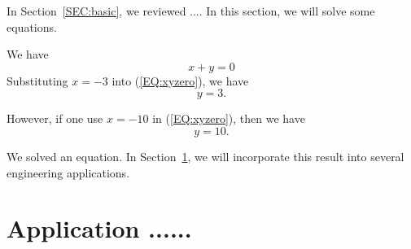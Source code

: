 \documentclass[11pt,a4paper]{article}
\begin{document}
In Section~\ref{SEC:basic}, we reviewed .... In this section, we will solve some equations.

We have 
\begin{equation}
x + y = 0
\label{EQ:xyzero}
\end{equation}
Substituting $x=-3$ into (\ref{EQ:xyzero}), we have 
\[
y=3.
\]

However, if one use $x=-10$ in (\ref{EQ:xyzero}), then we have 
\[
y=10.
\]


We solved an equation. In Section~\ref{SEC:Application}, we will incorporate this result into several engineering applications.

\section{Application ......} \label{SEC:Application}




% 
  




\end{document}
